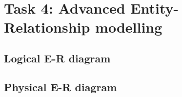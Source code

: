 \section{Task 4: Advanced Entity-Relationship modelling}

\subsection{Logical E-R diagram}

\subsection{Physical E-R diagram}
